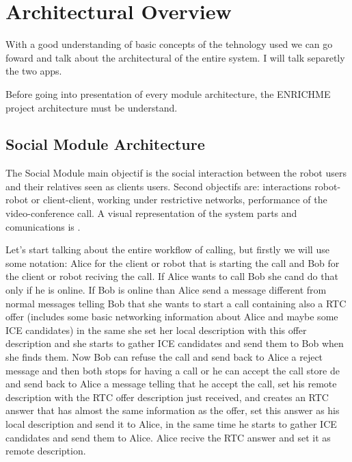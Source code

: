 \chapter{Architectural Overview}
\label{chapter:archi}
With a good understanding of basic concepts of the tehnology used we can go foward and
talk about the architectural of the entire system. I will talk separetly the two apps.

Before going into presentation of every module architecture, the ENRICHME project architecture
must be understand.


\section{Social Module Architecture}
\label{sec:socialmodule}
The Social Module main objectif is the social interaction between the robot users and their relatives seen as clients users.
Second objectifs are: interactions robot-robot or client-client, working under restrictive networks, performance of 
the video-conference call.
A visual representation of the system parts and comunications is .


Let's start talking about the entire workflow of calling, but firstly
we will use some notation: Alice for the client or robot that is starting the call and Bob for the client or robot reciving the
call. If Alice wants to call Bob she cand do that only if he is online. If Bob is online than Alice send a message
different from normal messages telling Bob that she wants to start a call containing also a RTC offer (includes some
basic networking information about Alice and maybe some ICE candidates) in the same she set 
her local description with this offer description and she starts to gather ICE candidates and send them to 
Bob when she finds them.
Now Bob can refuse the call and send back to Alice a reject message and then both stops for having a call or
he can accept the call store de  and send back to Alice a message
telling that he accept the call, set his remote description with the RTC offer description just received, and creates an
RTC answer that has almost the same information as the offer, set this answer as his local description
and send it to Alice, in the same time he starts to gather ICE candidates and send them to Alice.
Alice recive the RTC answer and set it as remote description.

